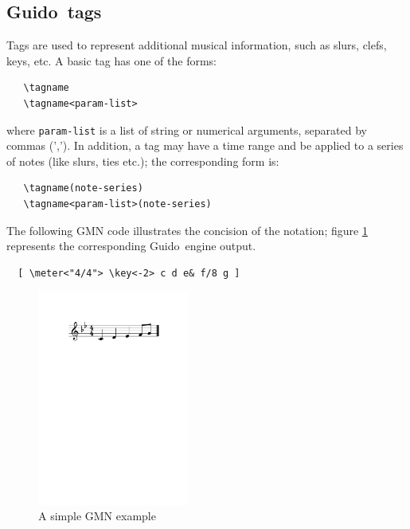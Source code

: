 \documentclass{article}
\newenvironment{gmnsyntax}		{\vspace{-2mm}\small}{\vspace{-2mm}}
\newcommand{\Guido}	{Guido}
\newcommand{\code}[1]	{{\small \texttt{#1}}}
\begin{document}
\subsection{\Guido\ tags}
Tags are used to represent additional musical information, such as slurs, clefs, keys, etc. A basic tag has one of the forms:
\begin{gmnsyntax} 
\begin{verbatim} 
   \tagname 
   \tagname<param-list>
\end{verbatim} 
\end{gmnsyntax}
\noindent where \code{param-list} is a list of string or numerical arguments, separated by commas (','). In addition, a tag may have a time range and be applied to a series of notes (like slurs, ties etc.); the corresponding form is:
\begin{gmnsyntax} 
\begin{verbatim} 
   \tagname(note-series)
   \tagname<param-list>(note-series)
\end{verbatim} 
\end{gmnsyntax} 

The following GMN code illustrates the concision of the notation; figure \ref{ex1} represents the corresponding \Guido\ engine output. 
\begin{gmnsyntax} 
\begin{verbatim} 
  [ \meter<"4/4"> \key<-2> c d e& f/8 g ]
\end{verbatim}
\end{gmnsyntax} 

\begin{figure}[h]
	\centering \includegraphics[width=50mm]{imgs/ex1}
 \caption{A simple GMN example}
 \label{ex1}
\end{figure}
\end{document}
